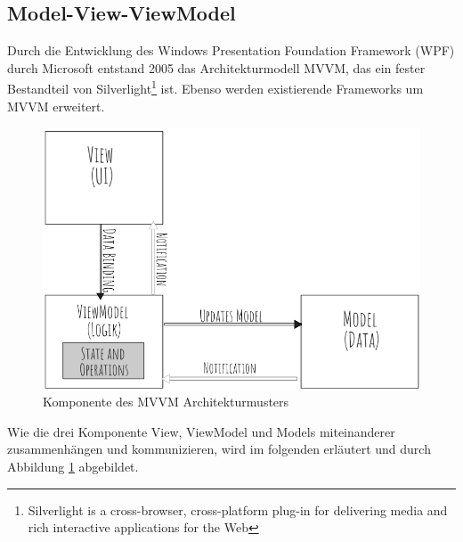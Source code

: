 \subsection{Model-View-ViewModel}
Durch die Entwicklung des Windows Presentation Foundation Framework (WPF) durch Microsoft entstand 2005 das Architekturmodell \ac{MVVM}, das ein fester Bestandteil von Silverlight\footnote{Silverlight is a cross-browser, cross-platform plug-in for delivering media and rich interactive applications for the Web} ist. Ebenso werden existierende Frameworks um \ac{MVVM} erweitert\cite{Jaeckle2015}.

\begin{figure}[h] 
\centering
\includegraphics[scale=0.45]{fig/mvvmv2.png} 
\caption{Komponente des MVVM Architekturmusters}
\label{fig:MVVM}
\end{figure} 
Wie die drei Komponente View, ViewModel und Models miteinanderer zusammenh\"angen und kommunizieren, wird im folgenden erl\"autert und durch Abbildung \ref{fig:MVVM} abgebildet.

